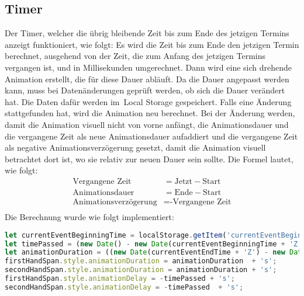 \subsection{Timer}\label{subsec:timer}
Der Timer, welcher die übrig bleibende Zeit bis zum Ende des jetzigen Termins anzeigt funktioniert, wie folgt:
\newline
\newline
Es wird die Zeit bis zum Ende den jetzigen Termin berechnet, ausgehend von der Zeit, die zum Anfang des jetzigen Termins vergangen ist, und in Millisekunden umgerechnet.
Dann wird eine sich drehende Animation erstellt, die für diese Dauer abläuft.
\newline
Da die Dauer angepasst werden kann, muss bei Datenänderungen geprüft werden, ob sich die Dauer verändert hat.
Die Daten dafür werden im~\gls{Local Storage} gespeichert.
Falls eine Änderung stattgefunden hat, wird die Animation neu berechnet.
Bei der Änderung werden, damit die Animation visuell nicht von vorne anfängt, die Animationsdauer und die vergangene Zeit als neue Animationsdauer aufaddiert und die vergangene Zeit als negative Animationsverzögerung gesetzt, damit die Animation visuell betrachtet dort ist, wo sie relativ zur neuen Dauer sein sollte.
\newline
\newline
Die Formel lautet, wie folgt:
\newline
\newline
\begin{equation}
\begin{aligned}
    \text{Vergangene Zeit} &= \text{Jetzt} - \text{Start} \\
\text{Animationsdauer} &= \text{Ende} - \text{Start} \\
    \text {Animationsverzögerung} &= \text{-Vergangene Zeit} \\
\end{aligned}\label{eq:equation}
\end{equation}
\newline
\newline
Die Berechnung wurde wie folgt implementiert:
\newline
\newline
\begin{lstlisting}[language=JavaScript,label={lst:JavaScript Timer}]
let currentEventBeginningTime = localStorage.getItem('currentEventBeginningTime');
let timePassed = (new Date() - new Date(currentEventBeginningTime + 'Z')) / 1000;
let animationDuration = ((new Date(currentEventEndTime + 'Z') - new Date(currentEventBeginningTime + 'Z')) / 1000);
firstHandSpan.style.animationDuration = animationDuration  + 's';
secondHandSpan.style.animationDuration = animationDuration + 's';
firstHandSpan.style.animationDelay = -timePassed + 's';
secondHandSpan.style.animationDelay = -timePassed  + 's';
\end{lstlisting}

